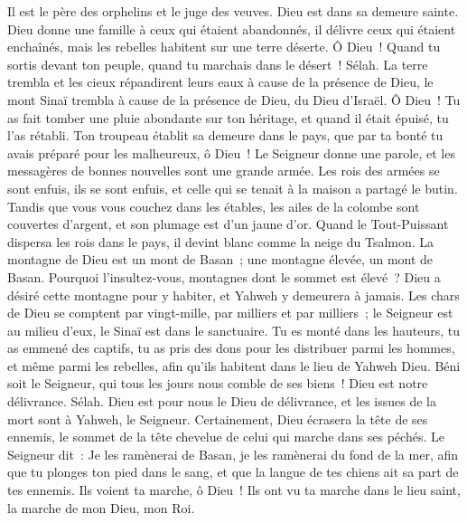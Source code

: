 \begin{multicols}{2}
Il est le père des orphelins et le juge des veuves. Dieu est dans sa demeure sainte.
Dieu donne une famille à ceux qui étaient abandonnés, il délivre ceux qui étaient enchaînés, mais les rebelles habitent sur une terre déserte.
Ô Dieu~! Quand tu sortis devant ton peuple, quand tu marchais dans le désert~! Sélah.
La terre trembla et les cieux répandirent leurs eaux à cause de la présence de Dieu, le mont Sinaï trembla à cause de la présence de Dieu, du Dieu d'Israël.
Ô Dieu~! Tu as fait tomber une pluie abondante sur ton héritage, et quand il était épuisé, tu l'as rétabli.
Ton troupeau établit sa demeure dans le pays, que par ta bonté tu avais préparé pour les malheureux, ô Dieu~!
Le Seigneur donne une parole, et les messagères de bonnes nouvelles sont une grande armée.
Les rois des armées se sont enfuis, ils se sont enfuis, et celle qui se tenait à la maison a partagé le butin.
Tandis que vous vous couchez dans les étables, les ailes de la colombe sont couvertes d'argent, et son plumage est d'un jaune d'or.
Quand le Tout-Puissant dispersa les rois dans le pays, il devint blanc comme la neige du Tsalmon.
La montagne de Dieu est un mont de Basan~; une montagne élevée, un mont de Basan.
Pourquoi l'insultez-vous, montagnes dont le sommet est élevé~? Dieu a désiré cette montagne pour y habiter, et Yahweh y demeurera à jamais.
Les chars de Dieu se comptent par vingt-mille, par milliers et par milliers~; le Seigneur est au milieu d'eux, le Sinaï est dans le sanctuaire.
Tu es monté dans les hauteurs, tu as emmené des captifs, tu as pris des dons pour les distribuer parmi les hommes, et même parmi les rebelles, afin qu'ils habitent dans le lieu de Yahweh Dieu.
Béni soit le Seigneur, qui tous les jours nous comble de ses biens~! Dieu est notre délivrance. Sélah.
Dieu est pour nous le Dieu de délivrance, et les issues de la mort sont à Yahweh, le Seigneur.
Certainement, Dieu écrasera la tête de ses ennemis, le sommet de la tête chevelue de celui qui marche dans ses péchés.
Le Seigneur dit~: Je les ramènerai de Basan, je les ramènerai du fond de la mer,
afin que tu plonges ton pied dans le sang, et que la langue de tes chiens ait sa part de tes ennemis.
Ils voient ta marche, ô Dieu~! Ils ont vu ta marche dans le lieu saint, la marche de mon Dieu, mon Roi.

\end{multicols}
